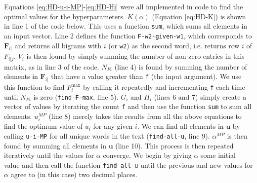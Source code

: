 Equations \ref{eq:HD-u-i-MP}-\ref{eq:HD-Hi} were all implemented in code to find the optimal values for the hyperparameters. $K(\alpha)$ (Equation \ref{eq:HD-K}) is shown in line 1 of the code below. This uses a function \lstinline!sum!, which sums all elements in an input vector. Line 2 defines the function \lstinline!F-w2-given-w1!, which corresponds to $\boldsymbol{F}_{i|}$ and returns all bigrams with $i$ (or \lstinline!w2!) as the second word, i.e. returns row $i$ of $F_{i|j}$. $V_{i}$ is then found by simply summing the number of non-zero entries in this matrix, as in line 3 of the code. $N_{Fi}$ (line 4) is found by summing the number of elements in $\boldsymbol{F}_{i|}$ that have a value greater than \lstinline!f! (the input argument). We use this function to find $F_{i}^{\text{max}}$ by calling it repeatedly and incrementing \lstinline!f! each time until $N_{Fi}$ is zero (\lstinline!find-F-max!, line 5). $G_{i}$ and $H_{i}$ (lines 6 and 7) simply create a vector of values by iterating the count \lstinline!f! and then use the function \lstinline!sum! to sum all elements. $u_{i}^{MP}$ (line 8) merely takes the results from all the above equations to find the optimum value of $u_{i}$ for any  given $i$. We can find all elements in $\boldsymbol{u}$ by calling \lstinline!u-i-MP! for all unique words in the text (\lstinline!find-all-u!, line 9). $\alpha^{MP}$ is then found by summing all elements in $\boldsymbol{u}$ (line 10). This process is then repeated iteratively until the values for $\alpha$ converge. We begin by giving $\alpha$ some initial value and then call the function \lstinline!find-all-u! until the previous and new values for $\alpha$ agree to (in this case) two decimal places.

